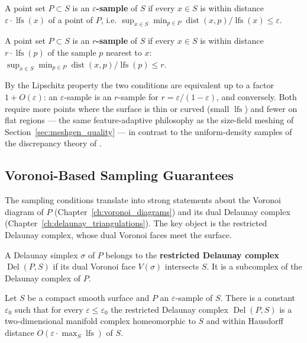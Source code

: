 \begin{definition}\label{def:shape_epsilon_sample}
  A point set $P \subset S$ is an \textbf{$\varepsilon$-sample} of $S$ if every
  $x \in S$ is within distance $\varepsilon \cdot \operatorname{lfs}(x)$ of a
  point of $P$, i.e. $\sup_{x \in S} \min_{p \in P}
  \operatorname{dist}(x, p) / \operatorname{lfs}(x) \le \varepsilon$.
\end{definition}

\begin{definition}[$r$-Sample]\label{def:shape_r_sample}
  A point set $P \subset S$ is an \textbf{$r$-sample} of $S$ if every $x \in S$
  is within distance $r \cdot \operatorname{lfs}(p)$ of the sample $p$ nearest
  to $x$: $\sup_{x \in S} \min_{p \in P} \operatorname{dist}(x, p) /
  \operatorname{lfs}(p) \le r$.
\end{definition}

By the Lipschitz property the two conditions are equivalent up to a factor
$1 + O(\varepsilon)$: an $\varepsilon$-sample is an $r$-sample for
$r = \varepsilon / (1 - \varepsilon)$, and conversely. Both require more points
where the surface is thin or curved (small $\operatorname{lfs}$) and fewer on
flat regions --- the same feature-adaptive philosophy as the size-field meshing
of Section~\ref{sec:meshgen_quality} --- in contrast to the uniform-density
samples of the discrepancy theory of \cite{matousek1999}.

\subsection{Voronoi-Based Sampling Guarantees}

The sampling conditions translate into strong statements about the Voronoi
diagram of $P$ (Chapter~\ref{ch:voronoi_diagrams}) and its dual Delaunay
complex (Chapter~\ref{ch:delaunay_triangulations}). The key object is the
restricted Delaunay complex, whose dual Voronoi faces meet the surface.

\begin{definition}\label{def:shape_restricted_delaunay}
  A Delaunay simplex $\sigma$ of $P$ belongs to the \textbf{restricted Delaunay
  complex} $\operatorname{Del}(P, S)$ if its dual Voronoi face $V(\sigma)$
  intersects $S$. It is a subcomplex of the Delaunay complex of $P$.
\end{definition}

\begin{theorem}\label{thm:shape_sampling_guarantee}
  Let $S$ be a compact smooth surface and $P$ an $\varepsilon$-sample of $S$.
  There is a constant $\varepsilon_0$ such that for every $\varepsilon \le
  \varepsilon_0$ the restricted Delaunay complex $\operatorname{Del}(P, S)$ is
  a two-dimensional manifold complex homeomorphic to $S$ and within Hausdorff
  distance $O(\varepsilon \cdot \max_S \operatorname{lfs})$ of $S$.
\end{theorem}


